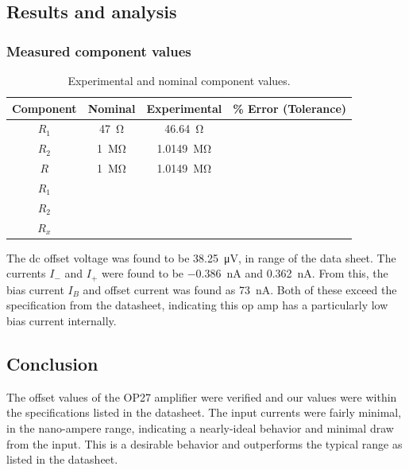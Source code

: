 \documentclass{report}
\begin{document}
\subsection{Results and analysis}

\subsubsection{Measured component values}
\begin{table}[h]
	\centering
	\caption{Experimental and nominal component values.}
	\label{table:exp3components}
	\begin{threeparttable}
		\begin{tabular}{cccc}
			\toprule
			Component & Nominal & Experimental & \% Error (Tolerance) \\
			\midrule
			$R_1$ & \SI{47}{\ohm} & \SI{46.64}{\ohm} & \\
			$R_2$ & \SI{1}{\Mohm} & \SI{1.0149}{\Mohm} & \\
			\midrule
			$R$ & \SI{1}{\Mohm} & \SI{1.0149}{\Mohm} & \\
			\midrule
			$R_1$ & & & \\
			$R_2$ & & & \\
			$R_x$ & & &\\
			\bottomrule
		\end{tabular}
	\end{threeparttable}
\end{table}
The dc offset voltage was found to be \SI{38.25}{\uV}, in range of the data sheet. The currents $I_-$ and $I_+$ were found to be \SI{-0.386}{\nA} and \SI{0.362}{\nA}. From this, the bias current $I_B$ and offset current was found as \SI{73}{\nA}. Both of these exceed the specification from the datasheet, indicating this op amp has a particularly low bias current internally.

\subsection{Conclusion}
The offset values of the OP27 amplifier were verified and our values were within the specifications listed in the datasheet. The input currents were fairly minimal, in the nano-ampere range, indicating a nearly-ideal behavior and minimal draw from the input. This is a desirable behavior and outperforms the typical range as listed in the datasheet.
\end{document}
